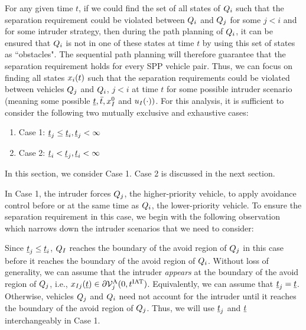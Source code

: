 For any given time $t$, if we could find the set of all states of $Q_i$ such that the separation requirement could be violated between $Q_i$ and $Q_j$ for some $j<i$ and for some intruder strategy, then during the path planning of $Q_i$, it can be ensured that $Q_i$ is not in one of these states at time $t$ by using this set of states as ``obstacles". The sequential path planning will therefore guarantee that the separation requirement holds for every SPP vehicle pair. Thus, we can focus on finding all states $x_i(t)$ such that the separation requirements could be violated between vehicles $Q_j$ and $Q_i$, $j <i$ at time $t$ for some possible intruder scenario (meaning some possible $\underline{t}, \bar{t}, x_{I}^0$ and $u_{I}(\cdot))$. For this analysis, it is sufficient to consider the following two mutually exclusive and exhaustive cases: 
\begin{enumerate}
\item Case 1: $\underline{t}_j \leq \underline{t}_i, \underline{t}_j < \infty$
\item Case 2: $\underline{t}_i < \underline{t}_j, \underline{t}_i <\infty$
\end{enumerate}
In this section, we consider Case 1. Case 2 is discussed in the next section.  

In Case 1, the intruder forces $Q_j$, the higher-priority vehicle, to apply avoidance control before or at the same time as $Q_i$, the lower-priority vehicle. %
To ensure the separation requirement in this case, we begin with the following observation which narrows down the intruder scenarios that we need to consider:
\begin{observation} \label{obs1_case1}
Since $\underline{t}_j \leq \underline{t}_i$, $Q_{I}$ reaches the boundary of the avoid region of $Q_j$ in this case before it reaches the boundary of the avoid region of $Q_i$. Without loss of generality, we can assume that the intruder \textit{appears} at the boundary of the avoid region of $Q_j$, i.e., $x_{I j}(\underline{t}) \in \partial \mathcal{V}^{\text{A}}_{j}(0, t^\text{IAT})$. Equivalently, we can assume that $\underline{t}_j = \underline{t}$. Otherwise, vehicles $Q_j$ and $Q_i$ need not account for the intruder until it reaches the boundary of the avoid region of $Q_j$. Thus, we will use $\underline{t}_j$ and $\underline{t}$ interchangeably in Case 1.
\end{observation}